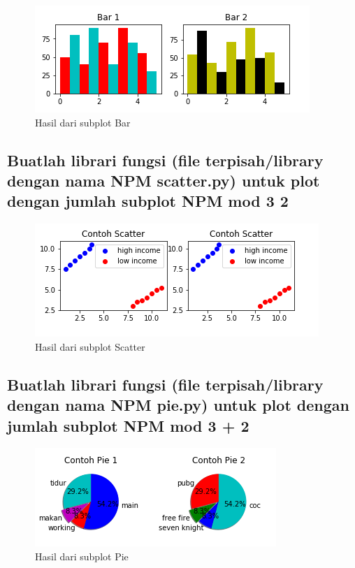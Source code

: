 

\begin{figure}[h]
\centering
\includegraphics[scale=0.9]{figures/6/Praktek/1174002/npm_bar.png}
\caption{Hasil dari subplot Bar}
\label{fig:contoh}
\end{figure}

\subsection{Buatlah librari fungsi (ﬁle terpisah/library dengan nama NPM scatter.py) untuk plot dengan jumlah subplot NPM mod 3  2}



\begin{figure}[h]
\centering
\includegraphics[scale=0.9]{figures/6/Praktek/1174002/scatter.png}
\caption{Hasil dari subplot Scatter}
\label{fig:contoh}
\end{figure}

\subsection{Buatlah librari fungsi (ﬁle terpisah/library dengan nama NPM pie.py) untuk plot dengan jumlah subplot NPM mod 3 + 2}



\begin{figure}[h]
\centering
\includegraphics[scale=1.2]{figures/6/Praktek/1174002/pie.png}
\caption{Hasil dari subplot Pie}
\label{fig:contoh}
\end{figure}

